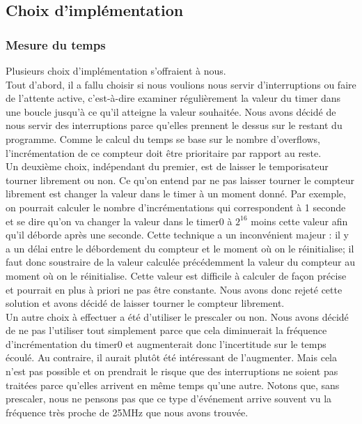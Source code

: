 \documentclass[12pt,a4paper]{article}
\begin{document}
    \subsection{Choix d'implémentation}
    
    \subsubsection{Mesure du temps}
    \label{mesuretemps}
    
    Plusieurs choix d'implémentation s'offraient à nous.\\
    
    Tout d'abord, il a fallu choisir si nous voulions nous servir d'interruptions ou faire de l'attente active, c'est-à-dire examiner régulièrement la valeur du timer dans une boucle jusqu'à ce qu'il atteigne la valeur souhaitée. Nous avons décidé de nous servir des interruptions parce qu'elles prennent le dessus sur le restant du programme. Comme le calcul du temps se base sur le nombre d'overflows, l'incrémentation de ce compteur doit être prioritaire par rapport au reste.\\
    
    Un deuxième choix, indépendant du premier, est de laisser le temporisateur tourner librement ou non. Ce qu'on entend par ne pas laisser tourner le compteur librement est changer la valeur dans le timer à un moment donné. Par exemple, on pourrait calculer le nombre d'incrémentations qui correspondent à 1 seconde et se dire qu'on va changer la valeur dans le timer0 à $2^{16}$ moins cette valeur afin qu'il déborde après une seconde. Cette technique a un inconvénient majeur : il y a un délai entre le débordement du compteur et le moment où on le réinitialise; il faut donc soustraire de la valeur calculée précédemment la valeur du compteur au moment où on le réinitialise. Cette valeur est difficile à calculer de façon précise et pourrait en plus à priori ne pas être constante. Nous avons donc rejeté cette solution et avons décidé de laisser tourner le compteur librement.\\
    
    Un autre choix à effectuer a été d'utiliser le prescaler ou non. Nous avons décidé de ne pas l'utiliser tout simplement parce que cela diminuerait la fréquence d'incrémentation du timer0 et augmenterait donc l'incertitude sur le temps écoulé. Au contraire, il aurait plutôt été intéressant de l'augmenter. Mais cela n'est pas possible et on prendrait le risque que des interruptions ne soient pas traitées parce qu'elles arrivent en même temps qu'une autre. Notons que, sans prescaler, nous ne pensons pas que ce type d'événement arrive souvent vu la fréquence très proche de \unit{25}{MHz} que nous avons trouvée. \\
    
\end{document}
